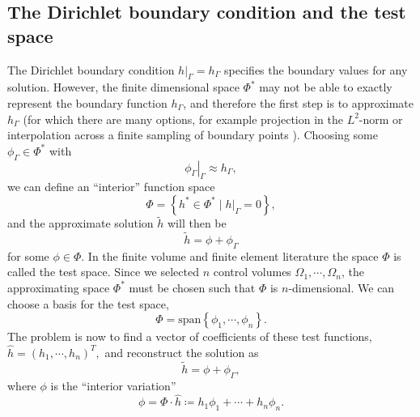 \subsection{The Dirichlet boundary condition and the test space}
The Dirichlet boundary condition $\left.h\right|_\Gamma = h_\Gamma$ specifies the boundary values for any solution.
However, the finite dimensional space $\Phi^*$ may not be able to exactly represent the boundary function $h_\Gamma$,
and therefore the first step is to approximate $h_\Gamma$ (for which there are many options, for example
projection in the $L^2$-norm or interpolation across a finite sampling of boundary points \cite{approximation_theory}). Choosing some $\phi_\Gamma \in \Phi^*$ with
    $$\left.\phi_\Gamma\right|_\Gamma \approx h_\Gamma,$$
we can define an ``interior'' function space
$$
    \Phi = \left\{h^* \in \Phi^* \mid \left.h\right|_\Gamma = 0 \right\},
$$
and the approximate solution $\tilde{h}$ will then be
$$
    \tilde{h} = \phi + \phi_\Gamma
$$
for some $\phi \in \Phi$.
In the finite volume and finite element literature the space $\Phi$ is called the test space.
Since we selected $n$ control volumes $\Omega_1,\cdots,\Omega_n$, the approximating space $\Phi^*$ must be chosen such that
$\Phi$ is $n$-dimensional. We can choose a basis for the test space,
    $$\Phi = \text{span}\left\{\phi_1,\cdots,\phi_n\right\}.$$
The problem is now to find a vector of coefficients of these test functions,
    $\hat{h} = (h_1, \cdots, h_n)^T,$
and reconstruct the solution as
    $$\tilde{h} = \phi + \phi_\Gamma,$$
where $\phi$ is the ``interior variation''
    $$\phi = \Phi\cdot \hat{h} \coloneqq h_1\phi_1 + \cdots + h_n\phi_n.$$

